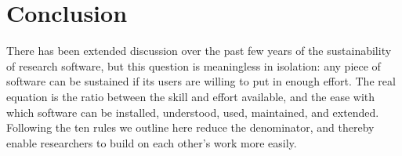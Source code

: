 \documentclass[10pt,letterpaper]{article}
\begin{document}
\section*{Conclusion}

There has been extended discussion over the past few years of the
sustainability of research software, but this question is meaningless
in isolation: any piece of software can be sustained if its users are
willing to put in enough effort.  The real equation is the ratio
between the skill and effort available, and the ease with which
software can be installed, understood, used, maintained, and extended.
Following the ten rules we outline here reduce the denominator, and
thereby enable researchers to build on each other's work more easily.


\end{document}
